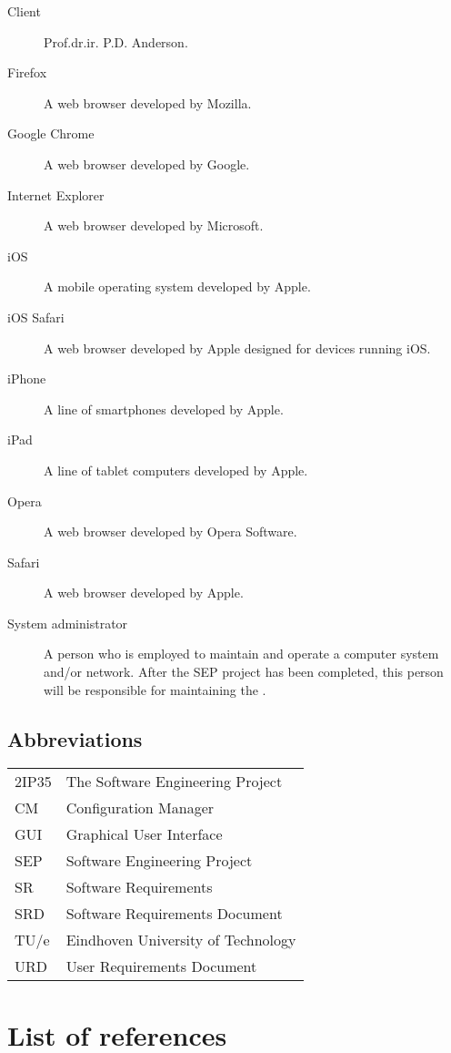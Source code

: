 \begin{description}
\item[Client] Prof.dr.ir. P.D. Anderson.
\item[Firefox] A web browser developed by Mozilla.
\item[Google Chrome] A web browser developed by Google.
\item[Internet Explorer] A web browser developed by Microsoft.
\item[iOS] A mobile operating system developed by Apple.
\item[iOS Safari] A web browser developed by Apple designed for devices running iOS.
\item[iPhone] A line of smartphones developed by Apple.
\item[iPad] A line of tablet computers developed by Apple.
\item[Opera] A web browser developed by Opera Software.
\item[Safari] A web browser developed by Apple.
\item[System administrator] A person who is employed to maintain and operate a computer system and/or network. After the SEP project has been completed, this person will be responsible for maintaining the \applicationname{}.
\end{description}

\subsection{Abbreviations}
\begin{tabular}{l|l}
2IP35 & The Software Engineering Project \\
CM    & Configuration Manager \\
GUI & Graphical User Interface \\
SEP   & Software Engineering Project \\
SR    & Software Requirements \\
SRD   & Software Requirements Document \\
TU/e  & Eindhoven University of Technology \\
URD   & User Requirements Document \\
\end{tabular}

\section{List of references}


